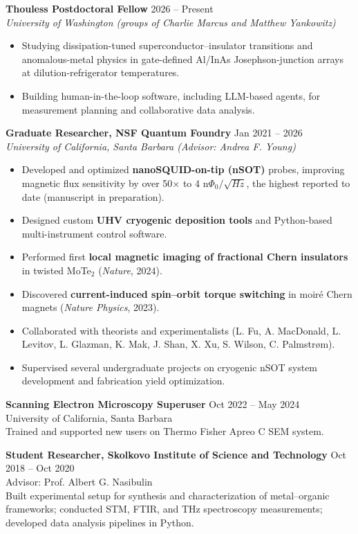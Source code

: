 \documentclass[11pt]{article}
\begin{document}
\textbf{Thouless Postdoctoral Fellow} \hfill 2026 -- Present\\
\emph{University of Washington (groups of Charlie Marcus and Matthew Yankowitz)}
\begin{itemize}[leftmargin=*]
    \item Studying dissipation-tuned superconductor--insulator transitions and anomalous-metal physics in gate-defined Al/InAs Josephson-junction arrays at dilution-refrigerator temperatures.
    \item Building human-in-the-loop software, including LLM-based agents, for measurement planning and collaborative data analysis.
\end{itemize}

\vspace{0.3em}
\textbf{Graduate Researcher, NSF Quantum Foundry} \hfill Jan 2021 -- 2026\\
\emph{University of California, Santa Barbara (Advisor: Andrea F. Young)}
\begin{itemize}[leftmargin=*]
    \item Developed and optimized \textbf{nanoSQUID-on-tip (nSOT)} probes, improving magnetic flux sensitivity by over 50× to 4 n$\Phi_0/\sqrt{Hz}$, the highest reported to date (manuscript in preparation).
    \item Designed custom \textbf{UHV cryogenic deposition tools} and Python-based multi-instrument control software.
    \item Performed first \textbf{local magnetic imaging of fractional Chern insulators} in twisted MoTe$_2$ (\textit{Nature}, 2024).
    \item Discovered \textbf{current-induced spin--orbit torque switching} in moir\'e Chern magnets (\textit{Nature Physics}, 2023).
    \item Collaborated with theorists and experimentalists (L. Fu, A. MacDonald, L. Levitov, L. Glazman, K. Mak, J. Shan, X. Xu, S. Wilson, C. Palmstrøm).
    \item Supervised several undergraduate projects on cryogenic nSOT system development and fabrication yield optimization.
\end{itemize}

\textbf{Scanning Electron Microscopy Superuser} \hfill Oct 2022 -- May 2024\\
University of California, Santa Barbara\\
Trained and supported new users on Thermo Fisher Apreo C SEM system.

\textbf{Student Researcher, Skolkovo Institute of Science and Technology} \hfill Oct 2018 -- Oct 2020\\
Advisor: Prof. Albert G. Nasibulin\\
Built experimental setup for synthesis and characterization of metal--organic frameworks; conducted STM, FTIR, and THz spectroscopy measurements; developed data analysis pipelines in Python.
\end{document}

